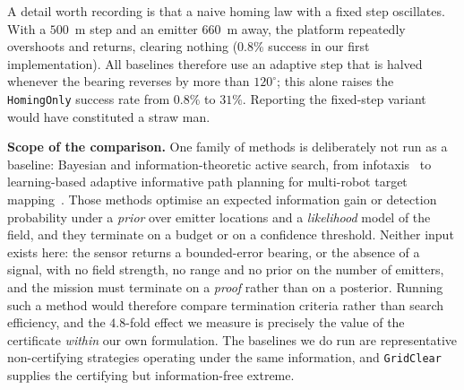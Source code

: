 \documentclass[journal,10pt]{IEEEtran}
\theoremstyle{definition}
\begin{document}
A detail worth recording is that a naive homing law with a fixed step oscillates. With a $500$~m
step and an emitter $660$~m away, the platform repeatedly overshoots and returns, clearing
nothing ($0.8\%$ success in our first implementation). All baselines therefore use an adaptive
step that is halved whenever the bearing reverses by more than $120^\circ$; this alone raises the
\texttt{HomingOnly} success rate from $0.8\%$ to $31\%$. Reporting the fixed-step variant would
have constituted a straw man.

\noindent\textbf{Scope of the comparison.} One family of methods is deliberately not run as a
baseline: Bayesian and information-theoretic active search, from
infotaxis~\cite{vergassola2007} to learning-based adaptive informative path planning for
multi-robot target mapping~\cite{popovic2024,vashisth2026}. Those methods optimise an expected information gain or detection
probability under a \emph{prior} over emitter locations and a \emph{likelihood} model of the
field, and they terminate on a budget or on a confidence threshold. Neither input exists here:
the sensor returns a bounded-error bearing, or the absence of a signal, with no field strength,
no range and no prior on the number of emitters, and the mission must terminate on a
\emph{proof} rather than on a posterior. Running such a method would therefore compare
termination criteria rather than search efficiency, and the $4.8$-fold effect we measure is
precisely the value of the certificate \emph{within} our own formulation. The baselines we do
run are representative non-certifying strategies operating under the same information, and
\texttt{GridClear} supplies the certifying but information-free extreme.
\end{document}
